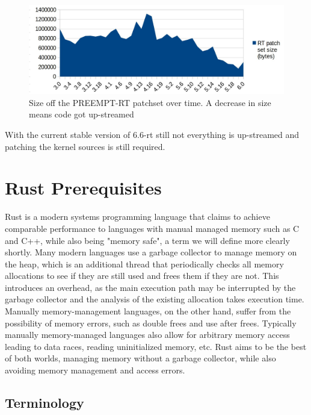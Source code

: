 \begin{figure}[H]
    \begin{center}
        \includegraphics[width=\textwidth]{assets/preempt.jpg}
        \caption{Size off the PREEMPT-RT patchset over time. A decrease in size means code got up-streamed}
        \label{fig:preempt}
    \end{center}
\end{figure}

With the current stable version of 6.6-rt still not everything is up-streamed and patching the kernel sources is still required.

\section{Rust Prerequisites}
\label{sec:background:rust}

Rust is a modern systems programming language
that claims to achieve comparable performance to languages with manual managed memory such as C and C++,
while also being "memory safe", a term we will define more clearly shortly.
Many modern languages use a garbage collector to manage memory on the heap,
which is an additional thread that periodically checks all memory allocations to see if they are still used and frees them if they are not.
This introduces an overhead, as the main execution path may be interrupted by the garbage collector and the analysis of the existing allocation takes execution time.
Manually memory-management languages, on the other hand, suffer from the possibility of memory errors, such as double frees and use after frees.
Typically manually memory-managed languages also allow for arbitrary memory access leading to data races, reading uninitialized memory, etc.
Rust aims to be the best of both worlds, managing memory without a garbage collector, while also avoiding memory management and access errors.

\subsection{Terminology}
\label{sec:background:terminology}

